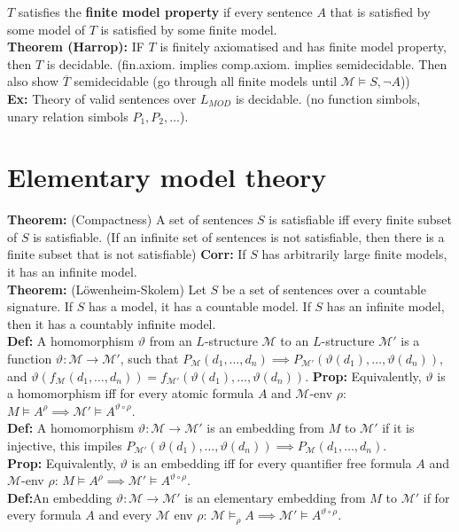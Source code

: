 \documentclass[a4paper,oneside,12pt]{article}
\theoremstyle{definition}
\newcommand{\M}{\ensuremath{\mathcal{M}}}
\renewcommand{\theta}{\vartheta}
\begin{document}
$T$ satisfies the \textbf{finite model property} if every sentence $A$ that is satisfied by some model of $T$ is satisfied by some finite model.\\
\textbf{Theorem (Harrop): }IF $T$ is finitely axiomatised and has finite model property, then $T$ is decidable. (fin.axiom. implies comp.axiom. implies semidecidable. Then also show $\overline{T}$ semidecidable (go through all finite models until $\M \vDash S, \neg A$))\\
\textbf{Ex: }Theory of valid sentences over $L_{MOD}$ is decidable. (no function simbols, unary relation simbols $P_1, P_2, \ldots$).

\section*{Elementary model theory}
\textbf{Theorem:} (Compactness)
A set of sentences $S$ is satisfiable iff every finite subset of $S$ is satisfiable.
(If an infinite set of sentences is not satisfiable, then there is a finite subset that is not satisfiable)
\textbf{Corr:} If $S$ has arbitrarily large finite models, it has an infinite model.\\
\textbf{Theorem:} (L\"owenheim-Skolem) Let $S$ be a set of sentences over a countable signature.
If $S$ has a model, it has a countable model. If $S$ has an infinite model,
then it has a countably infinite model. \\
\textbf{Def:} A homomorphism $\theta$ from an $L$-structure $\M$ to an $L$-structure $\M'$
is a function $\theta\colon\M\to\M'$, such that
$P_\M(d_1, \ldots, d_n) \implies P_{\M'}(\theta(d_1), \ldots, \theta(d_n))$, and
$\theta(f_\M(d_1, \ldots, d_n)) = f_{\M'}(\theta(d_1), \ldots, \theta(d_n))$.
\textbf{Prop:} Equivalently, $\theta$ is a homomorphism iff for every atomic formula $A$
and $\M$-env $\rho$: $M\models A^\rho \implies \M' \models A^{\theta\circ\rho}$. \\
\textbf{Def:} A homomorphism $\theta\colon\M\to\M'$  is an embedding from $M$ to $\M'$ if it is injective, this impiles $P_{\M'} (\theta(d_1), \ldots, \theta(d_n)) \implies P_\M(d_1, \ldots, d_n)$.\\
\textbf{Prop:} Equivalently, $\theta$ is an embedding iff for every quantifier free formula $A$
and $\M$-env $\rho$: $M\models A^\rho \implies \M' \models A^{\theta\circ\rho}$. \\
\textbf{Def:}An embedding $\theta\colon\M\to\M'$  is an elementary embedding from $M$ to $\M'$ if for every formula $A$ and every $\M$ env $\rho$: $\M \models_\rho A \implies \M'\models A^{\theta\circ\rho}$. \\
\end{document}

